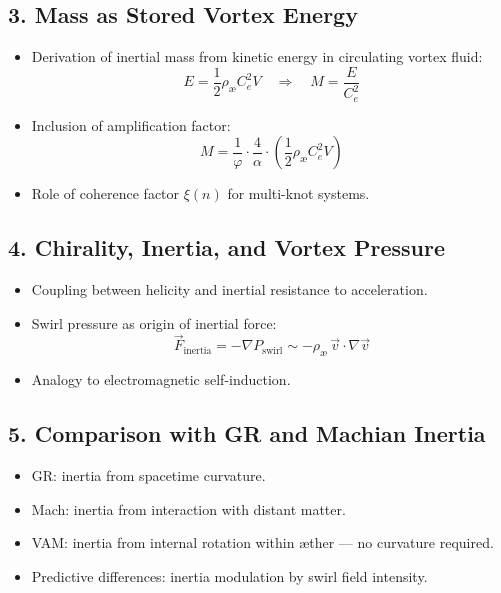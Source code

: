 \documentclass[twocolumn,aps,pre,floatfix,nofootinbib]{revtex4-2}
\begin{document}
\subsection*{3. Mass as Stored Vortex Energy}

\begin{itemize}
    \item Derivation of inertial mass from kinetic energy in circulating vortex fluid:
    \[
        E = \frac{1}{2} \rho_\text{\ae} C_e^2 V \quad \Rightarrow \quad M = \frac{E}{C_e^2}
    \]
    \item Inclusion of amplification factor:
    \[
        M = \frac{1}{\varphi} \cdot \frac{4}{\alpha} \cdot \left( \frac{1}{2} \rho_\text{\ae} C_e^2 V \right)
    \]
    \item Role of coherence factor $\xi(n)$ for multi-knot systems.
\end{itemize}

\subsection*{4. Chirality, Inertia, and Vortex Pressure}

\begin{itemize}
    \item Coupling between helicity and inertial resistance to acceleration.
    \item Swirl pressure as origin of inertial force:
    \[
        \vec{F}_\text{inertia} = -\nabla P_\text{swirl} \sim -\rho_\text{\ae} \, \vec{v} \cdot \nabla \vec{v}
    \]
    \item Analogy to electromagnetic self-induction.
\end{itemize}

\subsection*{5. Comparison with GR and Machian Inertia}

\begin{itemize}
    \item GR: inertia from spacetime curvature.
    \item Mach: inertia from interaction with distant matter.
    \item VAM: inertia from internal rotation within æther --- no curvature required.
    \item Predictive differences: inertia modulation by swirl field intensity.
\end{itemize}
\end{document}
